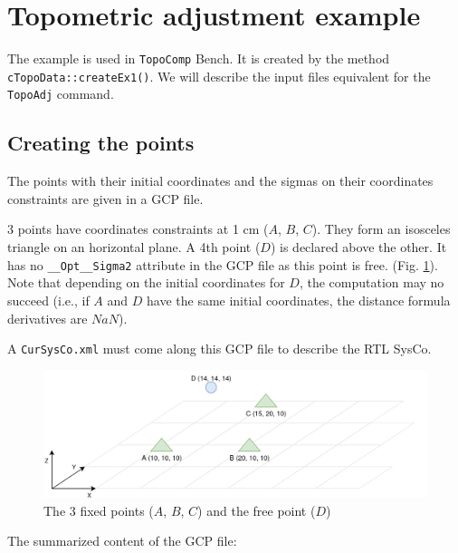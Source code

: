 \section{Topometric adjustment example}
\label{subsec:topoBench}

The example is used in \texttt{TopoComp} Bench. It is created by the method \texttt{cTopoData::createEx1()}.
We will describe the input files equivalent for the \texttt{TopoAdj} command.


\subsection{Creating the points}

The points with their initial coordinates and the sigmas on their coordinates constraints
are given in a GCP file. 

3 points have coordinates constraints at 1 cm ($A$, $B$, $C$). They form an isosceles triangle
on an horizontal plane.
A 4th point ($D$) is declared above the other. It has no {\tt \_\_Opt\_\_Sigma2} attribute in the GCP file as this point is free.
(Fig. \ref{fig:topoEx1}). Note that depending on the initial coordinates for $D$, the computation may no succeed
(i.e., if $A$ and $D$ have the same initial coordinates, the distance formula derivatives are $NaN$).

A {\tt CurSysCo.xml} must come along this GCP file to describe the RTL SysCo.


\begin{figure}[!h]
\centering
\includegraphics[width=12cm]{Programmer/benchtopo1b.png}
\caption{The 3 fixed points ($A$, $B$, $C$) and the free point ($D$)}
\label{fig:topoEx1}
\end{figure}

The summarized content of the GCP file:

